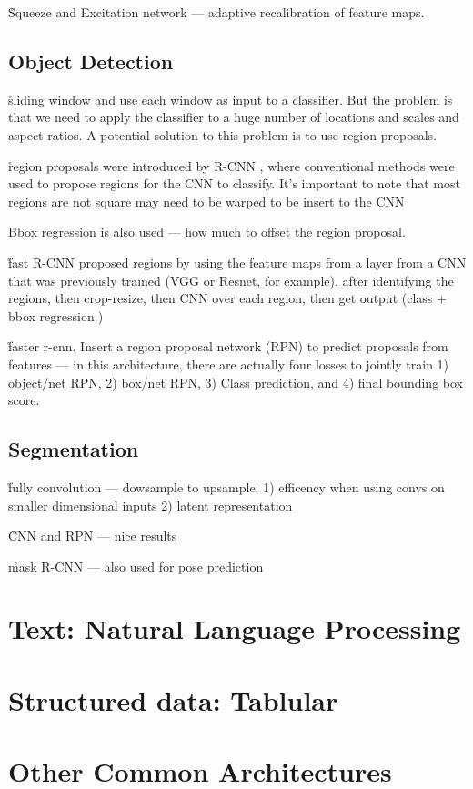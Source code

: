 \r{Squeeze and Excitation network --- adaptive recalibration of feature maps. }



\subsection{Object Detection}

\r{sliding window and use each window as input to a classifier. But the problem is that we need to apply the classifier to a huge number of locations and scales and aspect ratios. A potential solution to this problem is to use region proposals.}

\r{region proposals were introduced by R-CNN , where conventional methods were used to propose regions for the CNN to classify. It's important to note that most regions are not square may need to be warped to be insert to the CNN}

\r{Bbox regression is also used --- how much to offset the region proposal.}


\r{fast R-CNN proposed regions by using the feature maps from a layer from a CNN that was previously trained (VGG or Resnet, for example). after identifying the regions, then crop-resize, then CNN over each region, then get output (class + bbox regression.)}

\r{faster r-cnn. Insert a region proposal network (RPN) to predict proposals from features --- in this architecture, there are actually four losses to jointly train 1) object/net RPN, 2) box/net RPN, 3) Class prediction, and 4) final bounding box score.}


\subsection{Segmentation}

\r{fully convolution --- dowsample to upsample: 1) efficency when using convs on smaller dimensional inputs 2) latent representation}

\r{CNN and RPN --- nice results }

\r{mask R-CNN --- also used for pose prediction}



\section{Text: Natural Language Processing}


\section{Structured data: Tablular}


\section{Other Common Architectures}

